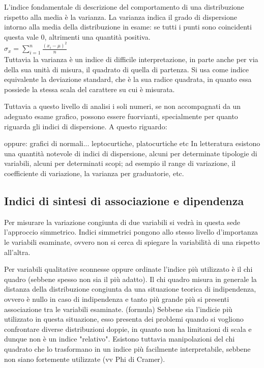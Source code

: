 \documentclass[a4paper]{article}
\begin{document}
L'indice fondamentale di descrizione del comportamento di una distribuzione rispetto alla media \`{e} la varianza.
La varianza indica il grado di dispersione intorno alla media della distribuzione in esame: se tutti i punti sono coincidenti questa vale 0, altrimenti una quantit\`{a} positiva.
\\
\begin{math}
 \sigma_x=\sum_{i=1}^n \frac{(x_i - \mu)^2}{n}
\end{math}
\\
Tuttavia la varianza \`{e} un indice di difficile interpretazione, in parte anche per via della sua unit\`{a} di misura, il quadrato di quella di partenza. Si usa come indice equivalente la deviazione standard, che \`{e} la sua radice quadrata, in quanto essa possiede la stessa scala del carattere su cui \`{e} misurata.

Tuttavia a questo livello di analisi i soli numeri, se non accompagnati da un adeguato esame grafico, possono essere fuorvianti, specialmente per quanto riguarda gli indici di dispersione. A questo riguardo:




oppure:
grafici di normali... leptocurtiche, platocurtiche etc
In letteratura esistono una quantit\`{a} notevole di indici di dispersione, alcuni per determinate tipologie di variabili, alcuni per determinati scopi; ad esempio il range di variazione, il coefficiente di variazione, la varianza per graduatorie, etc.

\subsection{Indici di sintesi di associazione e dipendenza}

Per misurare la variazione congiunta di due variabili si vedr\`{a} in questa sede l'approccio simmetrico.
Indici simmetrici pongono allo stesso livello d'importanza le variabili esaminate, ovvero non si cerca di spiegare la variabilit\`{a} di una rispetto all'altra.

Per variabili qualitative sconnesse oppure ordinate l'indice più utilizzato \`{e} il chi quadro (sebbene spesso non sia il più adatto). Il chi quadro misura in generale la distanza della distribuzione congiunta da una situazione teorica di indipendenza, ovvero \`{e} nullo in caso di indipendenza e tanto più grande più si presenti associazione tra le variabili esaminate.
(formula)
Sebbene sia l'indicie più utilizzato in questa situazione, esso presenta dei problemi quando si vogliono confrontare diverse distribuzioni doppie, in quanto non ha limitazioni di scala e dunque non \`{e} un indice "relativo". Esistono tuttavia manipolazioni del chi quadrato che lo trasformano in un indice più facilmente interpretabile, sebbene non siano fortemente utilizzate (vv Phi di Cramer).
\end{document}
